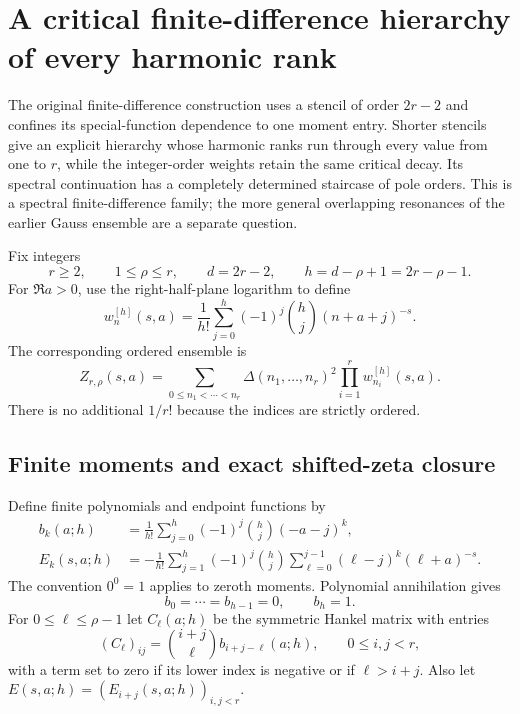 \section{A critical finite-difference hierarchy of every harmonic rank}
\label{hier:sec}

The original finite-difference construction uses a stencil of order
$2r-2$ and confines its special-function dependence to one moment entry.
Shorter stencils give an explicit hierarchy whose harmonic ranks run
through every value from one to $r$, while the integer-order weights
retain the same critical decay.  Its spectral continuation has a
completely determined staircase of pole orders.  This is a spectral
finite-difference family; the more general overlapping resonances of
the earlier Gauss ensemble are a separate question.

Fix integers
\begin{equation}\label{hier:parameters}
 r\ge2,\qquad 1\le\rho\le r,\qquad
 d=2r-2,\qquad h=d-\rho+1=2r-\rho-1.
\end{equation}
For $\Re a>0$, use the right-half-plane logarithm to define
\begin{equation}\label{hier:weight}
 w_n^{[h]}(s,a)=\frac1{h!}\sum_{j=0}^h(-1)^j\binom hj
                                      (n+a+j)^{-s}.
\end{equation}
The corresponding ordered ensemble is
\begin{equation}\label{hier:ensemble}
 Z_{r,\rho}(s,a)=
 \sum_{0\le n_1<\cdots<n_r}
 \Delta(n_1,\ldots,n_r)^2\prod_{i=1}^r w_{n_i}^{[h]}(s,a).
\end{equation}
There is no additional $1/r!$ because the indices are strictly ordered.

\subsection{Finite moments and exact shifted-zeta closure}

Define finite polynomials and endpoint functions by
\begin{align}
 b_k(a;h)&=\frac1{h!}\sum_{j=0}^h(-1)^j\binom hj(-a-j)^k,
                                                        \label{hier:b}\\
 E_k(s,a;h)&=-\frac1{h!}\sum_{j=1}^h(-1)^j\binom hj
       \sum_{\ell=0}^{j-1}(\ell-j)^k(\ell+a)^{-s}.
                                                        \label{hier:E}
\end{align}
The convention $0^0=1$ applies to zeroth moments.  Polynomial
annihilation gives
\begin{equation}\label{hier:annihilation}
 b_0=\cdots=b_{h-1}=0,\qquad b_h=1.
\end{equation}
For $0\le\ell\le\rho-1$ let $C_\ell(a;h)$ be the symmetric Hankel
matrix with entries
\begin{equation}\label{hier:C}
 (C_\ell)_{ij}=\binom{i+j}{\ell}b_{i+j-\ell}(a;h),
 \qquad 0\le i,j<r,
\end{equation}
with a term set to zero if its lower index is negative or if
$\ell>i+j$.  Also let $E(s,a;h)=(E_{i+j}(s,a;h))_{i,j<r}$.

